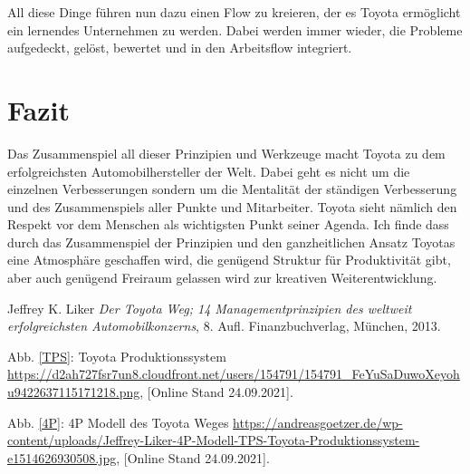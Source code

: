 \documentclass[a4paper,12pt]{scrartcl}
\begin{document}
All diese Dinge führen nun dazu einen Flow zu kreieren, der es Toyota ermöglicht ein lernendes Unternehmen zu werden. Dabei werden immer wieder, die Probleme aufgedeckt, gelöst, bewertet und in den Arbeitsflow integriert.

\clearpage
  
\section{Fazit}

Das Zusammenspiel all dieser Prinzipien und Werkzeuge macht Toyota zu dem erfolgreichsten Automobilhersteller der Welt. Dabei geht es nicht um die einzelnen Verbesserungen sondern um die Mentalität der ständigen Verbesserung und des Zusammenspiels aller Punkte und Mitarbeiter. Toyota sieht nämlich den Respekt vor dem Menschen als wichtigsten Punkt seiner Agenda. Ich finde dass durch das Zusammenspiel der Prinzipien und den ganzheitlichen Ansatz Toyotas eine Atmosphäre geschaffen wird, die genügend Struktur für Produktivität gibt, aber auch genügend Freiraum gelassen wird zur kreativen Weiterentwicklung. 

\clearpage
{}
\begin{thebibliography}{99}

 Jeffrey K. Liker \emph{Der Toyota Weg; 14 Managementprinzipien des weltweit erfolgreichsten Automobilkonzerns}, 8. Aufl. Finanzbuchverlag, München, 2013.


 Abb. \ref{TPS}: Toyota Produktionssystem \url{https://d2ah727fsr7un8.cloudfront.net/users/154791/154791_FeYuSaDuwoXeyohu9422637115171218.png}, [Online Stand 24.09.2021].

 Abb. \ref{4P}: 4P Modell des Toyota Weges \url{https://andreasgoetzer.de/wp-content/uploads/Jeffrey-Liker-4P-Modell-TPS-Toyota-Produktionssystem-e1514626930508.jpg}, [Online Stand 24.09.2021].

\end{thebibliography}
\end{document}

